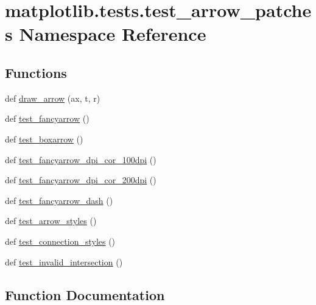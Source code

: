\hypertarget{namespacematplotlib_1_1tests_1_1test__arrow__patches}{}\section{matplotlib.\+tests.\+test\+\_\+arrow\+\_\+patches Namespace Reference}
\label{namespacematplotlib_1_1tests_1_1test__arrow__patches}
\subsection*{Functions}
\begin{DoxyCompactItemize}
\item 
def \hyperlink{namespacematplotlib_1_1tests_1_1test__arrow__patches_ae2a29028954292e50114b2713fe43fc4}{draw\+\_\+arrow} (ax, t, r)
\item 
def \hyperlink{namespacematplotlib_1_1tests_1_1test__arrow__patches_a09664d4185cbf2ac428a35b7db9fd3aa}{test\+\_\+fancyarrow} ()
\item 
def \hyperlink{namespacematplotlib_1_1tests_1_1test__arrow__patches_af325cc7dce9daf28c412fa12132a7e88}{test\+\_\+boxarrow} ()
\item 
def \hyperlink{namespacematplotlib_1_1tests_1_1test__arrow__patches_aed46dc1cc951dc91264c7cd6e35f9311}{test\+\_\+fancyarrow\+\_\+dpi\+\_\+cor\+\_\+100dpi} ()
\item 
def \hyperlink{namespacematplotlib_1_1tests_1_1test__arrow__patches_ac9230f551238d950fab900e6a516342c}{test\+\_\+fancyarrow\+\_\+dpi\+\_\+cor\+\_\+200dpi} ()
\item 
def \hyperlink{namespacematplotlib_1_1tests_1_1test__arrow__patches_a391e99c570c99b60f08492bec9531580}{test\+\_\+fancyarrow\+\_\+dash} ()
\item 
def \hyperlink{namespacematplotlib_1_1tests_1_1test__arrow__patches_a4a1e1ccdb599616ac47ee16f6052d629}{test\+\_\+arrow\+\_\+styles} ()
\item 
def \hyperlink{namespacematplotlib_1_1tests_1_1test__arrow__patches_a2a3fde3b421e2ebb13334a0bf74a3034}{test\+\_\+connection\+\_\+styles} ()
\item 
def \hyperlink{namespacematplotlib_1_1tests_1_1test__arrow__patches_a9e3d0191323c351df500cdce2e141fdc}{test\+\_\+invalid\+\_\+intersection} ()
\end{DoxyCompactItemize}


\subsection{Function Documentation}
\mbox{\label{namespacematplotlib_1_1tests_1_1test__arrow__patches_ae2a29028954292e50114b2713fe43fc4}} 
